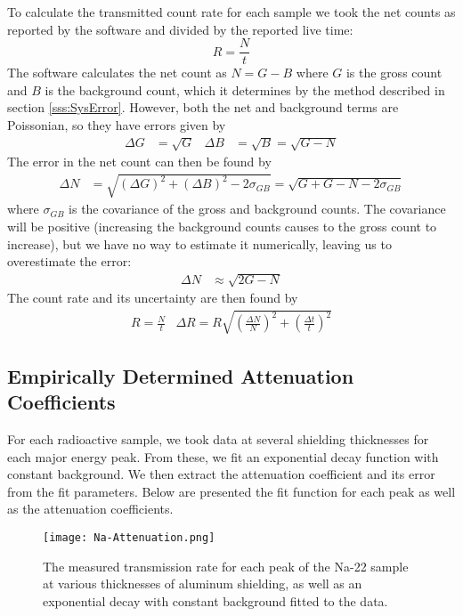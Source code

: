 \documentclass[letter]{article}
\begin{document}
To calculate the transmitted count rate for each sample we took the net counts as reported by the software and divided by the reported live time:
\begin{equation}
R = \frac{N}{t}
\end{equation}
The software calculates the net count as $N = G - B$ where $G$ is the gross count and $B$ is the background count, which it determines by the method described in section \ref{sss:SysError}. However, both the net and background terms are Poissonian, so they have errors given by
\begin{align}
\Delta G &= \sqrt{G} &
\Delta B &= \sqrt{B} = \sqrt{G - N}
\end{align}
The error in the net count can then be found by
\begin{align}
\Delta N 
&= 
\sqrt{ (\Delta G)^2 + (\Delta B)^2 - 2 \sigma_{GB}}
=
\sqrt{ G + G - N - 2 \sigma_{GB}}
\end{align}
where $\sigma_{GB}$ is the covariance of the gross and background counts. The covariance will be positive (increasing the background counts causes to the gross count to increase), but we have no way to estimate it numerically, leaving us to overestimate the error:
\begin{align}
\Delta N &\approx \sqrt{2G - N}
\end{align} 
The count rate and its uncertainty are then found by
\begin{align}
R = \frac{N}{t}
&
\Delta R = R \sqrt{ \left( \frac{\Delta N}{N} \right)^2 + \left( \frac{\Delta t}{t} \right)^2}
\end{align}


\subsection{Empirically Determined Attenuation Coefficients}

For each radioactive sample, we took data at several shielding thicknesses for each major energy peak. From these, we fit an exponential decay function with constant background. We then extract the attenuation coefficient and its error from the fit parameters. Below are presented the fit function for each peak as well as the attenuation coefficients.

\begin{figure}[h] \centering
    \texttt{[image: Na-Attenuation.png]}
    \caption{The measured transmission rate for each peak of the Na-22 sample at various thicknesses of aluminum shielding, as well as an exponential decay with constant background fitted to the data.}
    \label{fig:NaAtten}
\end{figure}
\end{document}
